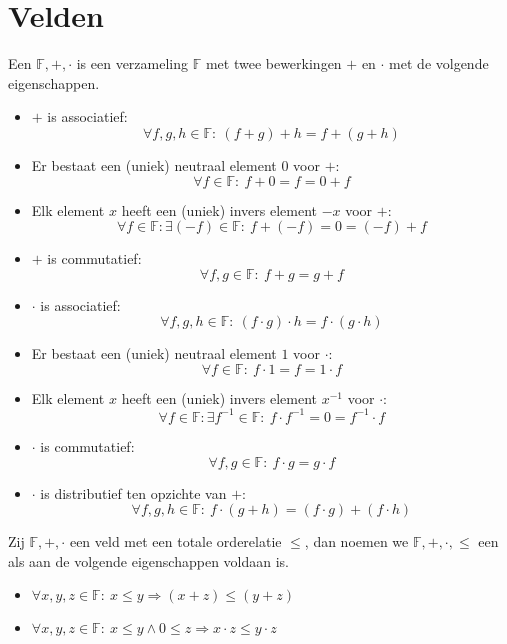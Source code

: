 \documentclass[main.tex]{subfiles}
\begin{document}
\section{Velden}
\label{sec:velden}

\begin{de}
  Een  $\mathbb{F},+,\cdot$ is een verzameling $\mathbb{F}$ met twee bewerkingen $+$ en $\cdot$ met de volgende eigenschappen.
  \begin{itemize}
  \item $+$ is associatief:
    \[ \forall f,g,h \in \mathbb{F}:\ (f+g)+h = f+(g+h) \]
  \item Er bestaat een (uniek) neutraal element $0$ voor $+$:
    \[ \forall f\in \mathbb{F}:\ f + 0 = f = 0 + f \]
  \item Elk element $x$ heeft een (uniek) invers element $-x$ voor $+$:
    \[ \forall f\in \mathbb{F}: \exists (-f) \in \mathbb{F}: \ f + (-f) = 0 = (-f) + f \]
  \item $+$ is commutatief:
    \[ \forall f,g \in \mathbb{F}:\ f+g = g+f \]
  \item $\cdot$ is associatief:
    \[ \forall f,g,h \in \mathbb{F}:\ (f\cdot g) \cdot h = f\cdot (g\cdot h) \]
  \item Er bestaat een (uniek) neutraal element $1$ voor $\cdot$:
    \[ \forall f\in \mathbb{F}:\ f \cdot 1 = f = 1 \cdot f \]
  \item Elk element $x$ heeft een (uniek) invers element $x^{-1}$ voor $\cdot$:
    \[ \forall f\in \mathbb{F}: \exists f^{-1} \in \mathbb{F}: \ f \cdot f^{-1} = 0 = f^{-1} \cdot f \]
  \item $\cdot$ is commutatief:
    \[ \forall f,g \in \mathbb{F}:\ f\cdot g = g \cdot f \]
  \item $\cdot$ is distributief ten opzichte van $+$:
    \[ \forall f,g,h \in \mathbb{F}:\ f \cdot (g+h) = (f \cdot g) + (f \cdot h) \]
  \end{itemize}
\end{de}

\begin{de}
  \label{de:totaal-geordend-veld}
  Zij $\mathbb{F},+,\cdot$ een veld met een totale orderelatie $\le$, dan noemen we $\mathbb{F},+,\cdot,\le$ een  als aan de volgende eigenschappen voldaan is.
  \begin{itemize}
  \item $\forall x,y,z \in \mathbb{F}:\ x \le y \Rightarrow (x+z) \le (y+z)$
  \item $\forall x,y,z \in \mathbb{F}:\ x \le y \wedge 0 \le z \Rightarrow x\cdot z \le y\cdot z$
  \end{itemize}
\end{de}
\end{document}

